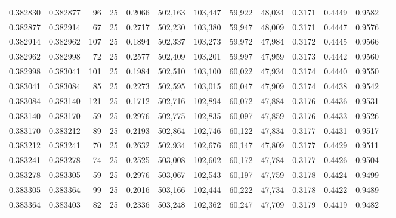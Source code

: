 \begin{tabular}{rrrrrrrrrrrrr}
0.382830 & 0.382877 &    96 &  25 &                                     0.2066 & 502,163 & 103,447 &  59,922 &  48,034 & 0.3171 & 0.4449 & 0.9582 \\
0.382877 & 0.382914 &    67 &  25 &                                     0.2717 & 502,230 & 103,380 &  59,947 &  48,009 & 0.3171 & 0.4447 & 0.9576 \\
0.382914 & 0.382962 &   107 &  25 &                                     0.1894 & 502,337 & 103,273 &  59,972 &  47,984 & 0.3172 & 0.4445 & 0.9566 \\
0.382962 & 0.382998 &    72 &  25 &                                     0.2577 & 502,409 & 103,201 &  59,997 &  47,959 & 0.3173 & 0.4442 & 0.9560 \\
0.382998 & 0.383041 &   101 &  25 &                                     0.1984 & 502,510 & 103,100 &  60,022 &  47,934 & 0.3174 & 0.4440 & 0.9550 \\
0.383041 & 0.383084 &    85 &  25 &                                     0.2273 & 502,595 & 103,015 &  60,047 &  47,909 & 0.3174 & 0.4438 & 0.9542 \\
0.383084 & 0.383140 &   121 &  25 &                                     0.1712 & 502,716 & 102,894 &  60,072 &  47,884 & 0.3176 & 0.4436 & 0.9531 \\
0.383140 & 0.383170 &    59 &  25 &                                     0.2976 & 502,775 & 102,835 &  60,097 &  47,859 & 0.3176 & 0.4433 & 0.9526 \\
0.383170 & 0.383212 &    89 &  25 &                                     0.2193 & 502,864 & 102,746 &  60,122 &  47,834 & 0.3177 & 0.4431 & 0.9517 \\
0.383212 & 0.383241 &    70 &  25 &                                     0.2632 & 502,934 & 102,676 &  60,147 &  47,809 & 0.3177 & 0.4429 & 0.9511 \\
0.383241 & 0.383278 &    74 &  25 &                                     0.2525 & 503,008 & 102,602 &  60,172 &  47,784 & 0.3177 & 0.4426 & 0.9504 \\
0.383278 & 0.383305 &    59 &  25 &                                     0.2976 & 503,067 & 102,543 &  60,197 &  47,759 & 0.3178 & 0.4424 & 0.9499 \\
0.383305 & 0.383364 &    99 &  25 &                                     0.2016 & 503,166 & 102,444 &  60,222 &  47,734 & 0.3178 & 0.4422 & 0.9489 \\
0.383364 & 0.383403 &    82 &  25 &                                     0.2336 & 503,248 & 102,362 &  60,247 &  47,709 & 0.3179 & 0.4419 & 0.9482 \\

\end{tabular}
